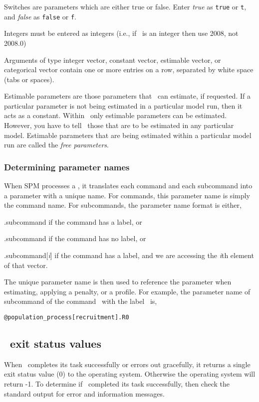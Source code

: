 Switches are parameters which are either true or false. Enter \emph{true} as \texttt{true} or \texttt{t}, and \emph{false} as \texttt{false} or \texttt{f}. 

Integers must be entered as integers (i.e., if \ is an integer then use 2008, not 2008.0)

Arguments of type integer vector, constant vector, estimable vector, or categorical vector contain one or more entries on a row, separated by white space (tabs or spaces). 

Estimable parameters are those parameters that \SPM\ can estimate, if requested. If a particular parameter is not being estimated in a particular model run, then it acts as a constant.  Within \SPM\, only estimable parameters can be estimated. However, you have to tell \SPM\ those that are to be estimated in any particular model. Estimable parameters that are being estimated within a particular model run are called the \emph{free parameters}.

\subsubsection{Determining parameter names}

When SPM processes a \config, it translates each command and each subcommand into a parameter with a unique name. For commands, this parameter name is simply the command name. For subcommands, the parameter name format is either, 

\begin{description}
\item {}.subcommand if the command has a label, or
\item {}.subcommand if the command has no label, or
\item {}.subcommand[\emph{i}] if the command has a label, and we are accessing the \emph{i}th element of that vector.
\end{description} 

The unique parameter name is then used to reference the parameter when estimating, applying a penalty, or a profile. For example, the parameter name of subcommand  of the command \ with the label \ is,

\texttt{@population\_process[recruitment].R0}

\subsection{\SPM\ exit status values}

When \SPM\ completes its task successfully or errors out gracefully, it returns a single exit status value (0) to the operating system. Otherwise the operating system will return -1. To determine if \SPM\ completed its task successfully, then check the standard output for error and information messages.
